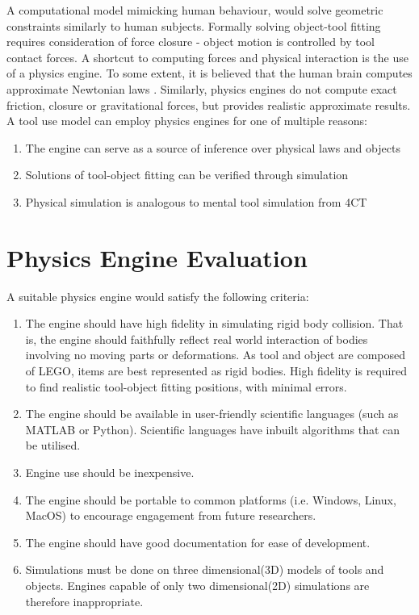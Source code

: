 \documentclass[11]{article}
\begin{document}
A computational model mimicking human behaviour, would solve geometric constraints similarly to human subjects.
Formally solving object-tool fitting requires consideration of force closure - object motion is controlled by tool contact forces.
A shortcut to computing forces and physical interaction is the use of a physics engine. 
To some extent, it is believed that the human brain computes approximate Newtonian laws \cite{battaglia2013}. 
Similarly, physics engines do not compute exact friction, closure or gravitational forces, but provides realistic approximate results. 
A tool use model can employ physics engines for one of multiple reasons:
\begin{enumerate}
\item The engine can serve as a source of inference over physical laws and objects 
\item Solutions of tool-object fitting can be verified through simulation
\item Physical simulation is analogous to mental tool simulation from 4CT
\end{enumerate}

\section{Physics Engine Evaluation}

A suitable physics engine would satisfy the following criteria:
\begin{enumerate}
\item The engine should have high fidelity in simulating rigid body collision. 
That is, the engine should faithfully reflect real world interaction of bodies involving no moving parts or deformations.
As tool and object are composed of LEGO, items are best represented as rigid bodies.   
High fidelity is required to find realistic tool-object fitting positions, with minimal errors.
\item The engine should be available in user-friendly scientific languages (such as MATLAB or Python). 
Scientific languages have inbuilt algorithms that can be utilised.
\item Engine use should be inexpensive.
\item The engine should be portable to common platforms (i.e. Windows, Linux, MacOS) to encourage engagement from future researchers.
\item The engine should have good documentation for ease of development.
\item Simulations must be done on three dimensional(3D) models of tools and objects.
Engines capable of only two dimensional(2D) simulations are therefore inappropriate.  
\end{enumerate}
\end{document}
